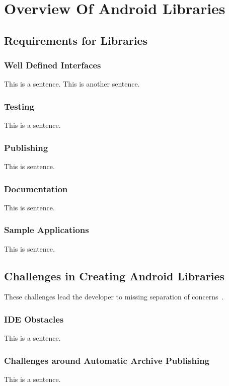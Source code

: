 \chapter{Overview Of Android Libraries}
\label{ch:overview}

\section{Requirements for Libraries}

\subsection{Well Defined Interfaces}
This is a sentence.
This is another sentence.

\subsection{Testing}
This is a sentence.

\subsection{Publishing}
This is sentence.

\subsection{Documentation}
This is sentence.

\subsection{Sample Applications}
This is sentence.

\section{Challenges in Creating Android Libraries}
These challenges lead the developer to missing separation of concerns~\cite{knuth:tb}.

\subsection{IDE Obstacles}
This is a sentence.

\subsection{Challenges around Automatic Archive Publishing}
This is a sentence.

